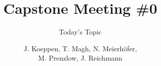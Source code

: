 \documentclass{beamer}
\title{Capstone Meeting \#0} %
\subtitle{Today's Topic} %
\author{\tiny J. Koeppen, T. Magh, N. Meierhöfer,\\ M. Prenzlow, J. Reichmann}
\institute{TH Köln}
\begin{document}
\frame{\titlepage}

\end{document}
